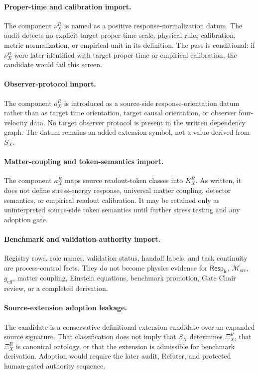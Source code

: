 \documentclass[11pt]{article}
\newcommand{\RespLC}{\mathsf{Resp}_{\mathrm{lc}}}
\newcommand{\Msrc}{\mathcal{M}_{\mathrm{src}}}
\newcommand{\geff}{g_{\mathrm{eff}}}
\newcommand{\XiR}{\Xi_X^R}
\newcommand{\SX}{S_X}
\begin{document}
\paragraph{Proper-time and calibration import.}
The component \(\nu_X^R\) is named as a positive response-normalization
datum. The audit detects no explicit target proper-time scale, physical
ruler calibration, metric normalization, or empirical unit in its
definition. The pass is conditional: if \(\nu_X^R\) were later
identified with target proper time or empirical calibration, the
candidate would fail this screen.

\paragraph{Observer-protocol import.}
The component \(o_X^R\) is introduced as a source-side
response-orientation datum rather than as target time orientation,
target causal orientation, or observer four-velocity data. No target
observer protocol is present in the written dependency graph. The datum
remains an added extension symbol, not a value derived from \(\SX\).

\paragraph{Matter-coupling and token-semantics import.}
The component \(\kappa_X^R\) maps source readout-token classes into
\(K_X^R\). As written, it does not define stress-energy response,
universal matter coupling, detector semantics, or empirical readout
calibration. It may be retained only as uninterpreted source-side token
semantics until further stress testing and any adoption gate.

\paragraph{Benchmark and validation-authority import.}
Registry rows, role names, validation status, handoff labels, and task
continuity are process-control facts. They do not become physics
evidence for \(\RespLC\), \(\Msrc\), \(\geff\), matter coupling,
Einstein equations, benchmark promotion, Gate Chair review, or a
completed derivation.

\paragraph{Source-extension adoption leakage.}
The candidate is a conservative definitional extension candidate over
an expanded source signature. That classification does not imply that
\(\SX\) determines \(\XiR\), that \(\XiR\) is canonical ontology, or
that the extension is admissible for benchmark derivation. Adoption
would require the later audit, Refuter, and protected human-gated
authority sequence.
\end{document}
